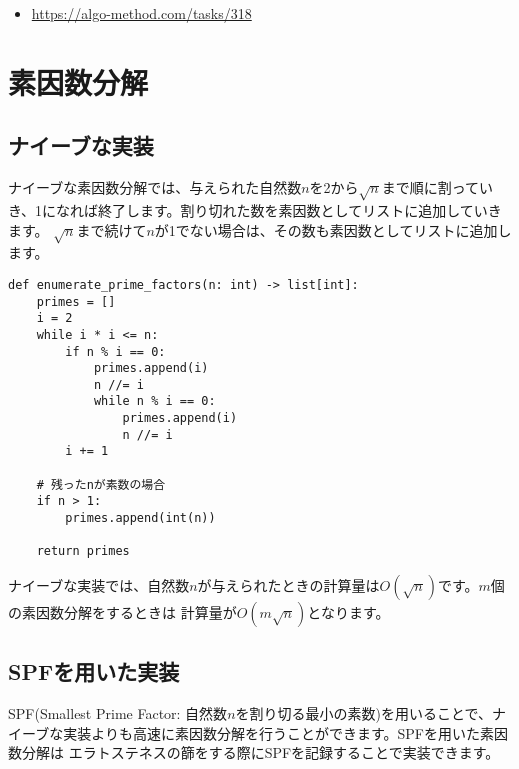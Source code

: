 \begin{itemize}
    \item \url{https://algo-method.com/tasks/318}
\end{itemize}

\section{素因数分解}
\subsection{ナイーブな実装}

ナイーブな素因数分解では、与えられた自然数$n$を2から$\sqrt{n}$まで順に割っていき、1になれば終了します。割り切れた数を素因数としてリストに追加していきます。
$\sqrt{n}$まで続けて$n$が1でない場合は、その数も素因数としてリストに追加します。

\begin{lstlisting}[caption=ナイーブな素因数分解の実装の実装, label=factor, frame=TRBL]
def enumerate_prime_factors(n: int) -> list[int]:
    primes = []
    i = 2
    while i * i <= n:
        if n % i == 0:
            primes.append(i)
            n //= i
            while n % i == 0:
                primes.append(i)
                n //= i
        i += 1

    # 残ったnが素数の場合
    if n > 1:
        primes.append(int(n))

    return primes
\end{lstlisting}

ナイーブな実装では、自然数$n$が与えられたときの計算量は$O(\sqrt{n})$です。$m$個の素因数分解をするときは
計算量が$O(m \sqrt{n})$となります。 

\subsection{SPFを用いた実装}

SPF(Smallest Prime Factor: 自然数$n$を割り切る最小の素数)を用いることで、ナイーブな実装よりも高速に素因数分解を行うことができます。SPFを用いた素因数分解は
エラトステネスの篩をする際にSPFを記録することで実装できます。


